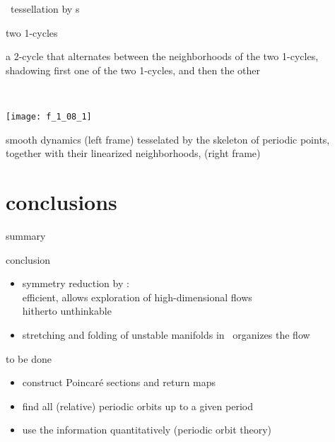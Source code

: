 \begin{frame}{\statesp\ tessellation by \po s}
    \begin{minipage}[b]{0.40\textwidth}
\begin{block}{}
two 1-cycles

\medskip

a 2-cycle that alternates
between the neighborhoods of the two 1-cycles,
shadowing first one of the
two 1-cycles, and then the other
\end{block}
    \end{minipage}
~~~~~~
    \begin{minipage}[b]{0.51\textwidth}
\begin{center}
\texttt{[image: f\_1\_08\_1]}
\end{center}
    \end{minipage}
smooth dynamics  (left frame) tesselated by the skeleton of periodic
points, together with their linearized neighborhoods, (right frame)
\end{frame}


\section[Summary]{conclusions}

 \begin{frame}{summary}

\begin{block}{conclusion}
  \begin{itemize}
   \item symmetry reduction by \mslices:
   \\
   efficient, allows
   exploration of high-dimensional flows\\
hitherto unthinkable
   \item stretching and folding
  	of unstable manifolds in \reducedsp\ organizes the flow
  \end{itemize}
\end{block}

\begin{block}{to be done}
\begin{itemize}
  \item construct Poincar\'e sections and return maps
  \item find all (relative) periodic orbits up to a given period
  \item use the information quantitatively (periodic orbit theory)
\end{itemize}
\end{block}
\end{frame}

